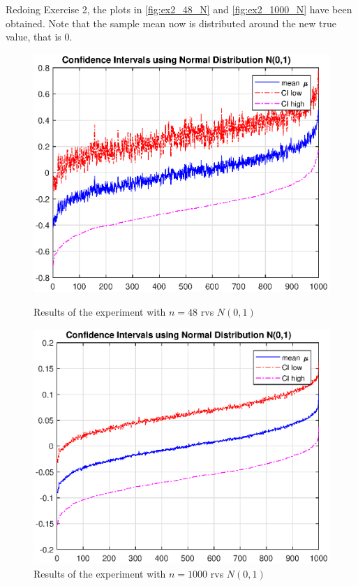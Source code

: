 \documentclass[11pt,a4paper]{article}
\begin{document}
\section{}

Redoing Exercise 2, the plots in \autoref{fig:ex2_48_N} and \autoref{fig:ex2_1000_N} have been obtained.
Note that the sample mean now is distributed around the new true value, that is $0$.

\begin{figure}[ht]
	\centering
	\begin{minipage}{0.45\textwidth}
		\centering
		\includegraphics[width=\textwidth]{ex2_48_N}
		\caption{Results of the experiment with $n=48$ rvs $N(0,1)$}
		\label{fig:ex2_48_N}
	\end{minipage}
	\begin{minipage}{0.45\textwidth}
		\centering
		\includegraphics[width=\textwidth]{ex2_1000_N}
		\caption{Results of the experiment with $n=1000$ rvs $N(0,1)$}
		\label{fig:ex2_1000_N}
	\end{minipage}
\end{figure}
\end{document}
